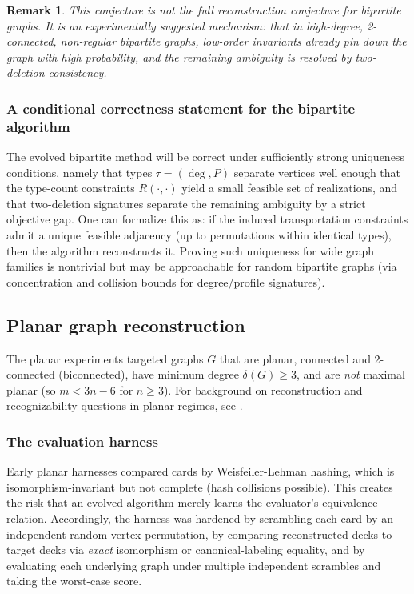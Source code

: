 \documentclass[11pt]{amsart}
\newtheorem{remark}{Remark}
\begin{document}
\begin{remark}
This conjecture is \emph{not} the full reconstruction conjecture for bipartite graphs. It is an experimentally suggested \emph{mechanism}: that in high-degree, 2-connected, non-regular bipartite graphs, low-order invariants already pin down the graph with high probability, and the remaining ambiguity is resolved by two-deletion consistency.
\end{remark}

\subsubsection{A conditional correctness statement for the bipartite algorithm}
The evolved bipartite method will be correct under sufficiently strong uniqueness conditions, namely that types $\tau=(\deg,P)$ separate vertices well enough that the type-count constraints $R(\cdot,\cdot)$ yield a small feasible set of realizations, and that two-deletion signatures separate the remaining ambiguity by a strict objective gap.
One can formalize this as: if the induced transportation constraints admit a unique feasible adjacency (up to permutations within identical types), then the algorithm reconstructs it. Proving such uniqueness for wide graph families is nontrivial but may be approachable for random bipartite graphs (via concentration and collision bounds for degree/profile signatures).


\subsection{Planar graph reconstruction}

The planar experiments targeted graphs $G$ that are planar, connected and 2-connected (biconnected), have minimum degree $\delta(G)\ge 3$, and are \emph{not} maximal planar (so $m < 3n-6$ for $n\ge 3$).
For background on reconstruction and recognizability questions in planar regimes, see \cite{BilinskiKwonYu2007,BondyHemminger1977}.

\subsubsection{The evaluation harness}
Early planar harnesses compared cards by Weisfeiler-Lehman hashing, which is isomorphism-invariant but not complete (hash collisions possible).
This creates the risk that an evolved algorithm merely learns the evaluator's equivalence relation.
Accordingly, the harness was hardened by scrambling each card by an independent random vertex permutation, by comparing reconstructed decks to target decks via \emph{exact} isomorphism or canonical-labeling equality, and by evaluating each underlying graph under multiple independent scrambles and taking the worst-case score.
\end{document}
